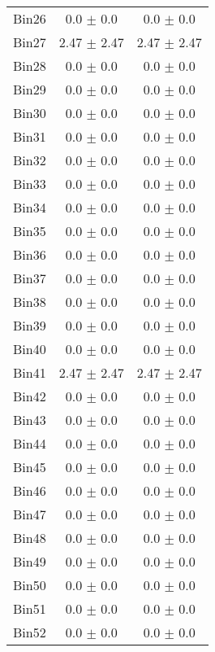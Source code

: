 \begin{tabular}{|c|c|c|}
     Bin26 & 0.0 $\pm$ 0.0 & 0.0 $\pm$ 0.0 \\ \cline{1-3} 
     Bin27 & 2.47 $\pm$ 2.47 & 2.47 $\pm$ 2.47 \\ \cline{1-3} 
     Bin28 & 0.0 $\pm$ 0.0 & 0.0 $\pm$ 0.0 \\ \cline{1-3} 
     Bin29 & 0.0 $\pm$ 0.0 & 0.0 $\pm$ 0.0 \\ \cline{1-3} 
     Bin30 & 0.0 $\pm$ 0.0 & 0.0 $\pm$ 0.0 \\ \cline{1-3} 
     Bin31 & 0.0 $\pm$ 0.0 & 0.0 $\pm$ 0.0 \\ \cline{1-3} 
     Bin32 & 0.0 $\pm$ 0.0 & 0.0 $\pm$ 0.0 \\ \cline{1-3} 
     Bin33 & 0.0 $\pm$ 0.0 & 0.0 $\pm$ 0.0 \\ \cline{1-3} 
     Bin34 & 0.0 $\pm$ 0.0 & 0.0 $\pm$ 0.0 \\ \cline{1-3} 
     Bin35 & 0.0 $\pm$ 0.0 & 0.0 $\pm$ 0.0 \\ \cline{1-3} 
     Bin36 & 0.0 $\pm$ 0.0 & 0.0 $\pm$ 0.0 \\ \cline{1-3} 
     Bin37 & 0.0 $\pm$ 0.0 & 0.0 $\pm$ 0.0 \\ \cline{1-3} 
     Bin38 & 0.0 $\pm$ 0.0 & 0.0 $\pm$ 0.0 \\ \cline{1-3} 
     Bin39 & 0.0 $\pm$ 0.0 & 0.0 $\pm$ 0.0 \\ \cline{1-3} 
     Bin40 & 0.0 $\pm$ 0.0 & 0.0 $\pm$ 0.0 \\ \cline{1-3} 
     Bin41 & 2.47 $\pm$ 2.47 & 2.47 $\pm$ 2.47 \\ \cline{1-3} 
     Bin42 & 0.0 $\pm$ 0.0 & 0.0 $\pm$ 0.0 \\ \cline{1-3} 
     Bin43 & 0.0 $\pm$ 0.0 & 0.0 $\pm$ 0.0 \\ \cline{1-3} 
     Bin44 & 0.0 $\pm$ 0.0 & 0.0 $\pm$ 0.0 \\ \cline{1-3} 
     Bin45 & 0.0 $\pm$ 0.0 & 0.0 $\pm$ 0.0 \\ \cline{1-3} 
     Bin46 & 0.0 $\pm$ 0.0 & 0.0 $\pm$ 0.0 \\ \cline{1-3} 
     Bin47 & 0.0 $\pm$ 0.0 & 0.0 $\pm$ 0.0 \\ \cline{1-3} 
     Bin48 & 0.0 $\pm$ 0.0 & 0.0 $\pm$ 0.0 \\ \cline{1-3} 
     Bin49 & 0.0 $\pm$ 0.0 & 0.0 $\pm$ 0.0 \\ \cline{1-3} 
     Bin50 & 0.0 $\pm$ 0.0 & 0.0 $\pm$ 0.0 \\ \cline{1-3} 
     Bin51 & 0.0 $\pm$ 0.0 & 0.0 $\pm$ 0.0 \\ \cline{1-3} 
     Bin52 & 0.0 $\pm$ 0.0 & 0.0 $\pm$ 0.0 \\ \cline{1-3} 

\end{tabular}
